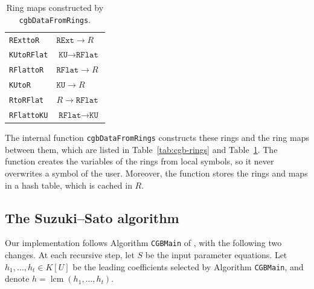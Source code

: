 \documentclass[11pt]{amsart}
\theoremstyle{plain}
\theoremstyle{definition}
\theoremstyle{remark}
\begin{document}
\begin{table}[htbp]
\begin{minipage}[t]{0.52\textwidth}
\begin{tabular}{ll}
            \texttt{RExttoR}
                & $\texttt{RExt} \to R$ \\
            \texttt{KUtoRFlat}
                & $\texttt{KU} \to \texttt{RFlat}$ \\
            \texttt{RFlattoR}
                & $\texttt{RFlat} \to R$ \\
            \texttt{KUtoR}
                & $\texttt{KU} \to R$ \\
            \texttt{RtoRFlat}
                & $R \to \texttt{RFlat}$ \\
            \texttt{RFlattoKU}
                & $\texttt{RFlat} \to \texttt{KU}$ \\
            \hline
        \end{tabular}
        \caption{Ring maps constructed by
        \texttt{cgbDataFromRings}.}
        \label{tab:cgb-maps}
    \end{minipage}
\end{table}

The internal function \texttt{cgbDataFromRings} constructs these rings and the ring maps between them, which are listed in Table~\ref{tab:cgb-rings} and Table~\ref{tab:cgb-maps}.
The function creates the variables of the rings from local symbols, so it never overwrites a symbol of the user. Moreover, the function stores the rings and maps in a hash table, which is cached in $R$.

\subsection{The Suzuki--Sato algorithm}

Our implementation follows Algorithm
\texttt{CGBMain} of \cite{SS}, with the following two changes.
At each recursive step, let $S$ be the input parameter equations. Let $h_1,\ldots,h_t\in K[U]$ be the leading coefficients selected by Algorithm \texttt{CGBMain}, and denote $h=\operatorname{lcm}(h_1,\ldots,h_t)$.
\end{document}
